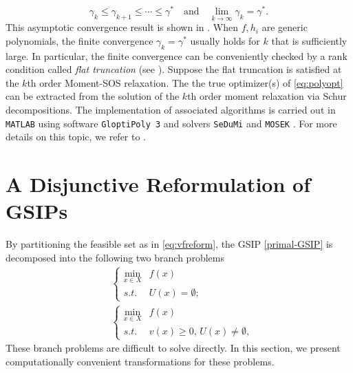 \documentclass{amsart}
\theoremstyle{plain}
\newcommand{\st}{\mathit{s.t.}}
\numberwithin{equation}{section}
\begin{document}
		\[
		\gamma_k\le \gamma_{k+1}\le \cdots\le \gamma^*\quad\mbox{and}\quad 
            \lim_{k\to \infty} \gamma_k = \gamma^*.
		\]
		This asymptotic convergence result is shown in \cite{Las01}.
            When $f,h_i$ are generic polynomials, the finite convergence $\gamma_k = \gamma^*$
            usually holds for $k$ that is sufficiently large.
		In particular, the finite convergence can be conveniently checked by 
            a rank condition called {\it flat truncation} (see \cite{nie2013certifying}).
        Suppose the flat truncation is satisfied at the $k$th order Moment-SOS relaxation.
		The the true optimizer(s) of \eqref{eq:polyopt} can be extracted from the solution 
		of the $k$th order moment relaxation via Schur decompositions.
        The implementation of associated algorithms is carried out in  
		{\tt MATLAB} using software {\tt GloptiPoly 3} \cite{GloPol3} 
		and solvers {\tt SeDuMi} \cite{sturm1999using} and {\tt MOSEK} \cite{mosek}.
		For more details on this topic, we refer to \cite[Chapters~4--6]{NieBook}.
		
		
		
		
		
		
		
		
		
		
		\section{A Disjunctive Reformulation of GSIPs}
		\label{sc:relGSIP}
	By partitioning the feasible set as in \eqref{eq:vfreform},
        the GSIP \eqref{primal-GSIP} is decomposed into the following two branch problems
		\begin{align}\label{eq:D1}
		&	\left\{\begin{array}{ll}
				\min\limits_{x\in X} & f(x)\\
				\st & U(x)=\emptyset;
			\end{array}
			\right.\\
			\label{eq:D2}
		&	\left\{\begin{array}{ll}
				\min\limits_{x\in X} & f(x)\\
				\st & v(x)\ge 0,\, U(x)\not=\emptyset,
			\end{array}
			\right.
		\end{align}
		These branch problems are difficult to solve directly.
		In this section, we present computationally convenient transformations for these problems.
		
\end{document}
